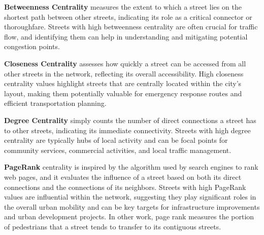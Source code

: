 \textbf{Betweenness Centrality} measures the extent to which a street lies on the shortest path between other streets, indicating its role as a critical connector or thoroughfare. Streets with high betweenness centrality are often crucial for traffic flow, and identifying them can help in understanding and mitigating potential congestion points.

\textbf{Closeness Centrality} assesses how quickly a street can be accessed from all other streets in the network, reflecting its overall accessibility. High closeness centrality values highlight streets that are centrally located within the city's layout, making them potentially valuable for emergency response routes and efficient transportation planning.

\textbf{Degree Centrality} simply counts the number of direct connections a street has to other streets, indicating its immediate connectivity. Streets with high degree centrality are typically hubs of local activity and can be focal points for community services, commercial activities, and local traffic management.

\textbf{PageRank} centrality is inspired by the algorithm used by search engines to rank web pages, and it evaluates the influence of a street based on both its direct connections and the connections of its neighbors. Streets with high PageRank values are influential within the network, suggesting they play significant roles in the overall urban mobility and can be key targets for infrastructure improvements and urban development projects. In other work, page rank measures the portion of pedestrians that a street tends to transfer to its contiguous streets.

